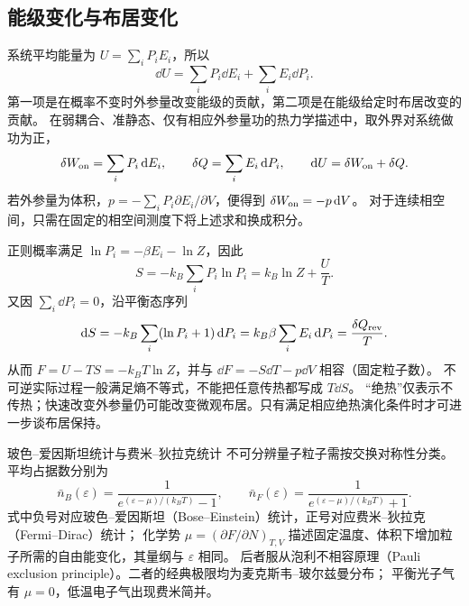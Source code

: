 \subsection{能级变化与布居变化}

系统平均能量为 $U=\sum_iP_iE_i$，所以
\begin{equation}
 \dd U=\sum_iP_i\dd E_i+\sum_iE_i\dd P_i.
\end{equation}
第一项是在概率不变时外参量改变能级的贡献，第二项是在能级给定时布居改变的贡献。
在弱耦合、准静态、仅有相应外参量功的热力学描述中，取外界对系统做功为正，
\[\delta W_{\rm on}=\sum_iP_i\mathop{}\!\mathrm d E_i,\qquad
\delta Q=\sum_iE_i\mathop{}\!\mathrm d P_i,\qquad \mathop{}\!\mathrm d U=\delta W_{\rm on}+\delta Q.\]
若外参量为体积，$p=-\sum_iP_i\partial E_i/\partial V$，便得到 $\delta W_{\rm on}=-p\mathop{}\!\mathrm d V$。
对于连续相空间，只需在固定的相空间测度下将上述求和换成积分。

正则概率满足 $\ln P_i=-\beta E_i-\ln Z$，因此
\[S=-k_B\sum_iP_i\ln P_i=k_B\ln Z+\frac UT.\]
又因 $\sum_i\dd P_i=0$，沿平衡态序列
\[\mathop{}\!\mathrm d S=-k_B\sum_i(\ln P_i+1)\mathop{}\!\mathrm d P_i
=k_B\beta\sum_iE_i\mathop{}\!\mathrm d P_i=\frac{\delta Q_{\rm rev}}T.\]
从而 $F=U-TS=-k_BT\ln Z$，并与 $\dd F=-S\dd T-p\dd V$ 相容（固定粒子数）。
不可逆实际过程一般满足熵不等式，不能把任意传热都写成 $T\dd S$。
“绝热”仅表示不传热；快速改变外参量仍可能改变微观布居。只有满足相应绝热演化条件时才可进一步谈布居保持。


\begingroup{}\begin{starread}{玻色--爱因斯坦统计与费米--狄拉克统计}
不可分辨量子粒子需按交换对称性分类。平均占据数分别为
\[
 \bar n_B(\varepsilon)=\frac1{e^{(\varepsilon-\mu)/(k_BT)}-1},\qquad
 \bar n_F(\varepsilon)=\frac1{e^{(\varepsilon-\mu)/(k_BT)}+1}.
\]
式中负号对应玻色--爱因斯坦（Bose--Einstein）统计，正号对应费米--狄拉克（Fermi--Dirac）统计；
化学势 $\mu=(\partial F/\partial N)_{T,V}$ 描述固定温度、体积下增加粒子所需的自由能变化，其量纲与 $\varepsilon$ 相同。
后者服从泡利不相容原理（Pauli exclusion principle）。二者的经典极限均为麦克斯韦--玻尔兹曼分布；
平衡光子气有 $\mu=0$，低温电子气出现费米简并。
\end{starread}\endgroup

\endgroup

\hypersetup{bookmarksdepth=2}
